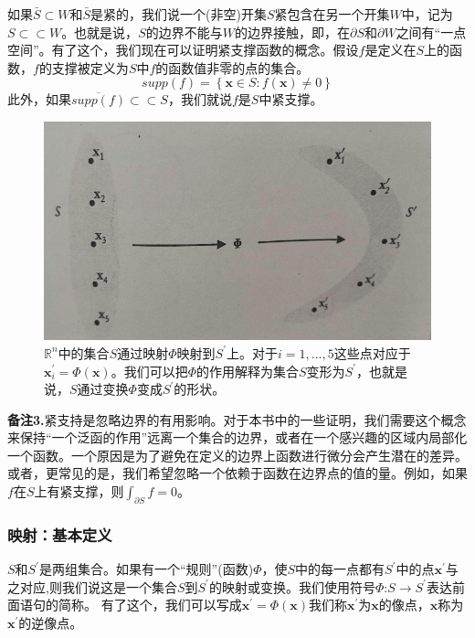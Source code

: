 \documentclass[12pt,a4paper]{article}
\numberwithin{equation}{section}
\begin{document}
如果$\bar{S} \subset W$和$\bar{S}$是紧的，我们说一个(非空)开集$S$紧包含在另一个开集$W$中，记为$S \subset \subset W$。也就是说，$S$的边界不能与$W$的边界接触，即，在$\partial S$和$\partial W$之间有“一点空间”。有了这个，我们现在可以证明紧支撑函数的概念。假设$f$是定义在$S$上的函数，$f$的支撑被定义为$S$中$f$的函数值非零的点的集合。
$$supp (f)= \left\{ \mathbf{x} \in S :f(\mathbf{x}) \neq 0 \right\}$$
此外，如果$\overline{supp (f)} \subset \subset S$，我们就说$f$是$S$中紧支撑。
\begin{figure}[H]
\centering
\includegraphics[scale=0.5]{./figures/22.png}
\caption{$\mathbb{R}^n$中的集合$S$通过映射$\Phi$映射到$S^{'}$上。对于$i=1,...,5$这些点对应于$\mathbf{x}_i^{'}=\Phi(\mathbf{x})$。我们可以把$\Phi$的作用解释为集合$S$变形为$S^{'}$，也就是说，$S$通过变换$\Phi$变成$S^{'}$的形状。}
\end{figure}

\textbf{备注3.}紧支持是忽略边界的有用影响。对于本书中的一些证明，我们需要这个概念来保持“一个泛函的作用”远离一个集合的边界，或者在一个感兴趣的区域内局部化一个函数。一个原因是为了避免在定义的边界上函数进行微分会产生潜在的差异。或者，更常见的是，我们希望忽略一个依赖于函数在边界点的值的量。例如，如果$f$在$S$上有紧支撑，则$\int _{\partial S}f=0$。

\subsubsection{映射：基本定义}
$S$和$S^{'}$是两组集合。如果有一个“规则”(函数)$\Phi$，使$S$中的每一点都有$S^{'}$中的点$\mathbf{x}^{'}$与之对应,则我们说这是一个集合$S$到$S^{'}$的映射或变换。我们使用符号$\Phi$:$S\rightarrow S^{'}$表达前面语句的简称。
有了这个，我们可以写成$\mathbf{x}^{'}=\Phi (\mathbf{x})$我们称$\mathbf{x}^{'}$为$\mathbf{x}$的像点，$\mathbf{x}$称为$\mathbf{x}^{'}$的逆像点。
\end{document}
